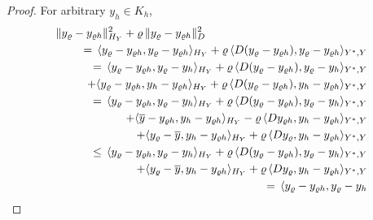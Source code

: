\documentclass{article}
\numberwithin{equation}{section}
\begin{document}
\begin{proof}
  For arbitrary $y_h \in K_h$,
  \begin{eqnarray*}
    \| y_\varrho - y_{\varrho h} \|^2_{H_Y} +
    \varrho \, \| y_\varrho - y_{\varrho h} \|^2_D
    && \\
    && \hspace*{-5cm}
       = \, \langle y_\varrho - y_{\varrho h} , y_\varrho - y_{\varrho h}
       \rangle_{H_Y} + \varrho \, \langle D (y_\varrho - y_{\varrho h}),
       y_\varrho - y_{\varrho h} \rangle_{Y^*,Y} \\
    && \hspace*{-5cm}
       = \, \langle y_\varrho - y_{\varrho h} , y_\varrho - y_h
       \rangle_{H_Y} + \varrho \, \langle D (y_\varrho - y_{\varrho h}),
       y_\varrho - y_h \rangle_{Y^*,Y} \\
    && \hspace*{-4cm}
       + \langle y_\varrho - y_{\varrho h} , y_h - y_{\varrho h}
       \rangle_{H_Y} + \varrho \, \langle D (y_\varrho - y_{\varrho h}),
       y_h - y_{\varrho h} \rangle_{Y^*,Y} \\
    && \hspace*{-5cm}
       = \, \langle y_\varrho - y_{\varrho h} , y_\varrho - y_h
       \rangle_{H_Y} + \varrho \, \langle D (y_\varrho - y_{\varrho h}),
       y_\varrho - y_h \rangle_{Y^*,Y} \\
    && \hspace*{-4cm}
       + \langle \overline{y} - y_{\varrho h} , y_h - y_{\varrho h}
       \rangle_{H_Y} - \varrho \, \langle D y_{\varrho h},
       y_h - y_{\varrho h} \rangle_{Y^*,Y} \\
    && \hspace*{-3cm}
       + \langle y_\varrho - \overline{y} , y_h - y_{\varrho h}
       \rangle_{H_Y} + \varrho \, \langle D y_\varrho ,
       y_h - y_{\varrho h} \rangle_{Y^*,Y} \\
    && \hspace*{-5cm}
       \leq \, \langle y_\varrho - y_{\varrho h} , y_\varrho - y_h
       \rangle_{H_Y} + \varrho \, \langle D (y_\varrho - y_{\varrho h}),
       y_\varrho - y_h \rangle_{Y^*,Y} \\
    && \hspace*{-3cm}
       + \langle y_\varrho - \overline{y} , y_h - y_{\varrho h}
       \rangle_{H_Y} + \varrho \, \langle D y_\varrho ,
       y_h - y_{\varrho h} \rangle_{Y^*,Y} \\
    && \hspace*{-5cm}
       = \, \langle y_\varrho - y_{\varrho h} , y_\varrho - y_h

\end{eqnarray*}
\end{proof}
\end{document}
